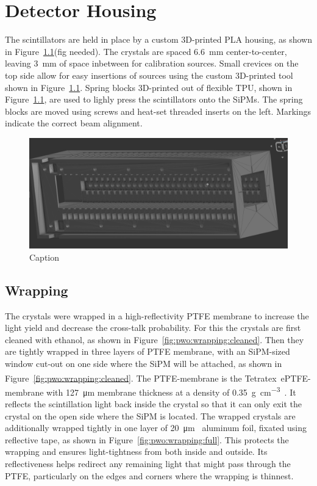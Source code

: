 \section{Detector Housing}
The scintillators are held in place by a custom 3D-printed PLA housing, as shown in Figure~\ref{}(fig needed).
The crystals are spaced \SI{6.6}{\milli\meter} center-to-center, leaving \SI{3}{\milli\meter} of space inbetween for calibration sources.
Small crevices on the top side allow for easy insertions of sources using the custom 3D-printed tool shown in Figure~\ref{}.
Spring blocks 3D-printed out of flexible TPU, shown in Figure~\ref{}, are used to lighly press the scintillators onto the \glspl{SiPM}.
The spring blocks are moved using screws and heat-set threaded inserts on the left.
Markings indicate the correct beam alignment.

\begin{figure}[h]
    \centering
    \includegraphics[width=0.5\linewidth]{fig/pbwo4Detector/housingSTL.png}
    \caption{Caption}
    \label{fig:enter-label}
\end{figure}

\subsection{Wrapping}
The crystals were wrapped in a high-reflectivity PTFE membrane to increase the light yield and decrease the cross-talk probability.
For this the crystals are first cleaned with ethanol, as shown in Figure~\ref{fig:pwo:wrapping:cleaned}.
Then they are tightly wrapped in three layers of PTFE membrane, with an \gls{SiPM}-sized window cut-out on one side where the SiPM will be attached, as shown in Figure~\ref{fig:pwo:wrapping:cleaned}.
The PTFE-membrane is the Tetratex\textsuperscript{{\textregistered}}~ePTFE-membrane with \SI{127}{\micro\meter} membrane thickness at a density of \SI{0.35}{\gram\per\centi\meter^3}~\cite{rene}. %
It reflects the scintillation light back inside the crystal so that it can only exit the crystal on the open side where the SiPM is located.
The wrapped crystals are additionally wrapped tightly in one layer of \SI{20}{\micro\meter}~\cite{rene} aluminum foil, fixated using reflective tape, as shown in Figure~\ref{fig:pwo:wrapping:full}.
This protects the wrapping and ensures light-tightness from both inside and outside.
Its reflectiveness helps redirect any remaining light that might pass through the PTFE, particularly on the edges and corners where the wrapping is thinnest.

